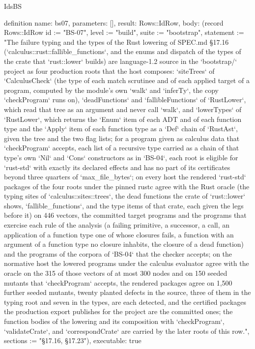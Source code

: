 \begin{lexlean}{IdsBS}
\begin{semanticmodule}
definition{
  name: bs07,
  parameters: [],
  result: Rows::IdRow,
  body: (record Rows::IdRow {id := "BS-07", level := "build", suite := "bootstrap", statement := "The failure typing and the types of the Rust lowering of SPEC.md §17.16 (`calculus::rust::fallible_functions`, and the enums and dispatch of the types of the crate that `rust::lower` builds) are language-1.2 source in the `bootstrap/` project as four production roots that the host composes: `siteTrees` of `CalculusCheck` (the type of each match scrutinee and of each applied target of a program, computed by the module's own `walk` and `inferTy`, the copy `checkProgram` runs on), `deadFunctions` and `fallibleFunctions` of `RustLower`, which read that tree as an argument and never call `walk`, and `lowerTypes` of `RustLower`, which returns the `Enum` item of each ADT and of each function type and the `Apply` item of each function type as a `Def` chain of `RustAst`, given the tree and the two flag lists; for a program given as calculus data that `checkProgram` accepts, each list of a recursive type carried as a chain of that type's own `Nil` and `Cons` constructors as in `BS-04`, each root is eligible for `rust-std` with exactly its declared effects and has no part of its certificates beyond three quarters of `max_file_bytes`; on every host the rendered `rust-std` packages of the four roots under the pinned rustc agree with the Rust oracle (the typing sites of `calculus::sites::trees`, the dead functions the crate of `rust::lower` shows, `fallible_functions`, and the type items of that crate, each given the legs before it) on 446 vectors, the committed target programs and the programs that exercise each rule of the analysis (a failing primitive, a successor, a call, an application of a function type one of whose closures fails, a function with an argument of a function type no closure inhabits, the closure of a dead function) and the programs of the corpora of `BS-04` that the checker accepts; on the normative host the lowered programs under the calculus evaluator agree with the oracle on the 315 of those vectors of at most 300 nodes and on 150 seeded mutants that `checkProgram` accepts, the rendered packages agree on 1,500 further seeded mutants, twenty planted defects in the source, three of them in the typing root and seven in the types, are each detected, and the certified packages the production export publishes for the project are the committed ones; the function bodies of the lowering and its composition with `checkProgram`, `validateCrate`, and `correspondCrate` are carried by the later roots of this row.", sections := "§17.16, §17.23"}),
  executable: true
}


\end{semanticmodule}
\end{lexlean}
